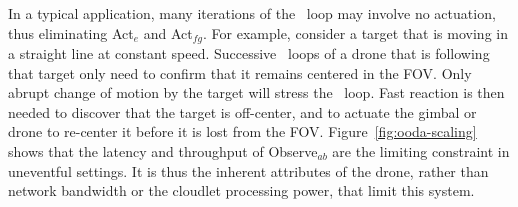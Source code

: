In a typical application, many iterations of the \ooda~loop may
involve no actuation, thus eliminating Act$_{e}$ and Act$_{fg}$.  For
example, consider a target that is moving in a straight line at
constant speed.  Successive \ooda~loops of a drone that is following
that target only need to confirm that it remains centered in the FOV.
Only abrupt change of motion by the target will stress the \ooda~loop.
Fast reaction is then needed to discover that the target is
off-center, and to actuate the gimbal or drone to re-center it before
it is lost from the FOV.  Figure~\ref{fig:ooda-scaling} shows that the
latency and throughput of Observe$_{ab}$ are the limiting constraint
in uneventful settings.  It is thus the inherent attributes
of the drone, rather than network bandwidth or the cloudlet processing
power, that limit this system.





